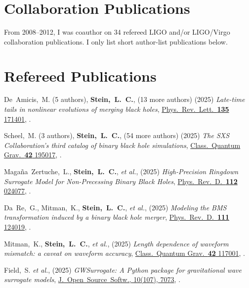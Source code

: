 \section{Collaboration Publications}
From 2008--2012, I was coauthor on 34 refereed LIGO and/or LIGO/Virgo
collaboration publications. I only list short author-list publications below.

\section{Refereed Publications}
\secstartswithlist{}%
\addtocounter{pubCounter}{-1}%
\begin{etaremune}[start=\value{pubCounter}]
\item
  De~Amicis,~M.
  (5 authors),
  {\bf Stein,~L.~C.},
  (13 more authors)
  (2025)
  {\it Late-time tails in nonlinear evolutions of merging black holes},
  \href{https://doi.org/10.1103/2brx-xnyr}%
  {Phys.~Rev.~Lett.~{\bf 135} 171401},
  .
\item
  Scheel,~M.
  (3 authors),
  {\bf Stein,~L.~C.},
  (54 more authors)
  (2025)
  {\it The SXS Collaboration's third catalog of binary black hole simulations},
  \href{https://doi.org/10.1088/1361-6382/adfd34}%
  {Class.~Quantum Grav.~{\bf 42} 195017},
  .
\item
  Magaña~Zertuche,~L.,
  {\bf Stein,~L.~C.},
  {\it et al.},
  (2025)
  {\it High-Precision Ringdown Surrogate Model for Non-Precessing Binary Black Holes},
  \href{https://doi.org/10.1103/q7sy-g3kl}%
  {Phys.~Rev.~D.~{\bf 112} 024077},
  .
\item
  Da~Re,~G.,
  Mitman,~K.,
  {\bf Stein,~L.~C.},
  {\it et al.},
  (2025)
  {\it Modeling the BMS transformation induced by a binary black hole merger},
  \href{https://doi.org/10.1103/PhysRevD.111.124019}%
  {Phys.~Rev.~D.~{\bf 111} 124019},
  .
\item
  Mitman,~K.,
  {\bf Stein,~L.~C.},
  {\it et al.},
  (2025)
  {\it Length dependence of waveform mismatch: a caveat on waveform accuracy},
  \href{https://doi.org/10.1088/1361-6382/add8d9}%
  {Class.~Quantum Grav.~{\bf 42} 117001},
  .
\item
  Field,~S.
  {\it et al.},
  (2025)
  {\it GWSurrogate: A Python package for gravitational wave surrogate models},
  \href{https://doi.org/10.21105/joss.07073}{J.~Open~Source~Softw., 10(107), 7073},
  .

\end{etaremune}

